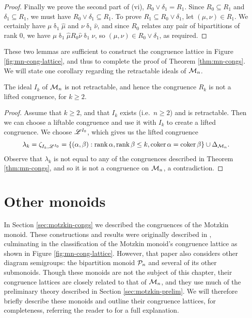 \begin{lemma}
\begin{proof}
    Finally we prove the second part of (vi), $R_0 \vee \delta_1 = R_1$.  Since
    $R_0 \subseteq R_1$ and $\delta_1 \subseteq R_1$, we must have
    $R_0 \vee \delta_1 \subseteq R_1$.  To prove
    $R_1 \subseteq R_0 \vee \delta_1$, let $(\mu, \nu) \in R_1$.  We certainly
    have $\mu \mathrel\delta_1 \widehat\mu$ and
    $\nu \mathrel\delta_1 \widehat\nu$, and since $R_0$ relates any pair of
    bipartitions of rank $0$, we have
    $\mu \mathrel\delta_1 \widehat\mu \mathrel{R_0} \widehat\nu \mathrel\delta_1
    \nu$, so $(\mu, \nu) \in R_0 \vee \delta_1$, as required.
  \end{proof}
\end{lemma}

These two lemmas are sufficient to construct the congruence lattice in Figure
\ref{fig:mn-cong-lattice}, and thus to complete the proof of Theorem
\ref{thm:mn-congs}.  We will state one corollary regarding the retractable
ideals of $\mathcal{M}_n$.

\begin{corollary}
  \label{cor:rk-not-lifted}
  The ideal $I_k$ of $\mathcal{M}_n$ is not retractable, and hence the congruence $R_k$
  is not a lifted congruence, for $k \geq 2$.
  \begin{proof}
    Assume that $k \geq 2$, and that $I_k$ exists (i.e.~$n \geq 2$) and is
    retractable.  Then we can choose a liftable congruence and use it with $I_k$
    to create a lifted congruence.  We choose $\mathscr{L}^{I_0}$, which gives us the
    lifted congruence
    $$\lambda_k = \zeta_{I_k, \mathscr{L}^{I_0}}
    = \{(\alpha,\beta) :
    \operatorname{rank}\alpha,\operatorname{rank}\beta \leq k,
    \operatorname{coker}\alpha = \operatorname{coker}\beta\} \cup \Delta_{\mathcal{M}_n}.$$
    Observe that $\lambda_k$ is not equal to any of the congruences described in
    Theorem \ref{thm:mn-congs}, and so it is not a congruence on $\mathcal{M}_n$, a
    contradiction.
  \end{proof}
\end{corollary}

\section{Other monoids}
\label{sec:motzkin-other}
In Section \ref{sec:motzkin-congs} we described the congruences of the Motzkin
monoid.  These constructions and results were originally described in
\cite{ourpaper}, culminating in the classification of the Motzkin monoid's
congruence lattice as shown in Figure \ref{fig:mn-cong-lattice}.  However, that
paper also considers other diagram semigroups: the bipartition monoid $\mathcal{P}_n$
and several of its other submonoids.  Though these monoids are not the subject
of this chapter, their congruence lattices are closely related to that of
$\mathcal{M}_n$, and they use much of the preliminary theory described in Section
\ref{sec:motzkin-prelim}.  We will therefore briefly describe these monoids and
outline their congruence lattices, for completeness, referring the reader to
\cite{ourpaper} for a full explanation.

